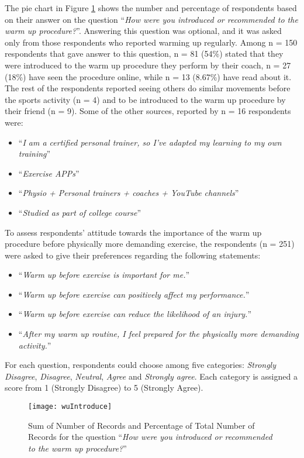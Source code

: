 The pie chart in Figure \ref{fig:wuIntroduce} shows the number and percentage of respondents based on their answer on the question ``\textit{How were you introduced or recommended to the warm up procedure?}''. Answering this question was optional, and it was asked only from those respondents who reported warming up regularly. Among n = 150 respondents that gave answer to this question, n = 81 (54\%) stated that they were introduced to the warm up procedure they perform by their coach, n = 27 (18\%) have seen the procedure online, while n = 13 (8.67\%) have read about it. The rest of the respondents reported seeing others do similar movements before the sports activity (n = 4) and to be introduced to the warm up procedure by their friend (n = 9). Some of the other sources, reported by n = 16 respondents were:
\begin{itemize}
\item ``\textit{I am a certified personal trainer, so I've adapted my learning to my own training}''
\item  ``\textit{Exercise APPs}''
\item  ``\textit{Physio + Personal trainers + coaches + YouTube channels}''
\item  ``\textit{Studied as part of college course}''
\end{itemize}
To assess respondents' attitude towards the importance of the warm up procedure before physically more demanding exercise, the respondents (n = 251) were asked to give their preferences regarding the following statements: 
\begin{itemize}
\item ``\textit{Warm up before exercise is important for me.}''
\item  ``\textit{Warm up before exercise can positively affect my performance.}''
\item  ``\textit{Warm up before exercise can reduce the likelihood of an injury.}''
\item  ``\textit{After my warm up routine, I feel prepared for the physically more demanding activity.}''
\end{itemize}
For each question, respondents could choose among five categories: \textit{Strongly Disagree}, \textit{Disagree}, \textit{Neutral}, \textit{Agree} and \textit{Strongly agree}. Each category is assigned a score from 1 (Strongly Disagree) to 5 (Strongly Agree). \begin{figure}[h]
    \centering
    \texttt{[image: wuIntroduce]}
    \caption{Sum of Number of Records and Percentage of Total Number of Records for the question ``\textit{How were you introduced or recommended to the warm up procedure?}''}
    \label{fig:wuIntroduce}
\end{figure}\\
